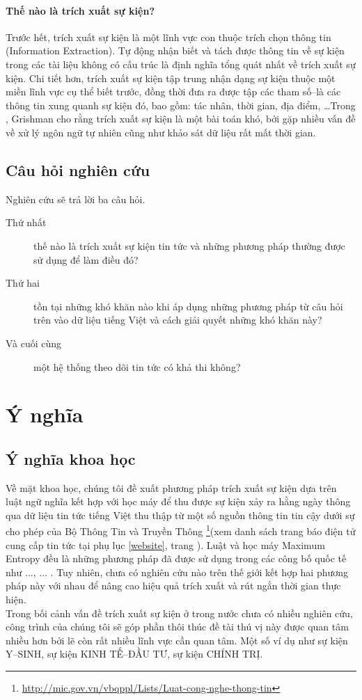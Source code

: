 \paragraph{Thế nào là trích xuất sự kiện?} Trước hết, trích xuất sự kiện là một lĩnh vực con thuộc trích chọn thông tin (Information Extraction). Tự động nhận biết và tách được thông tin về sự kiện trong các tài liệu không có cấu trúc là định nghĩa tổng quát nhất về trích xuất sự kiện. Chi tiết hơn, trích xuất sự kiện tập trung nhận dạng sự kiện thuộc một miền lĩnh vực cụ thể biết trước, đồng thời đưa ra được tập các tham số--là các thông tin xung quanh sự kiện đó, bao gồm: tác nhân, thời gian, địa điểm, \ldots Trong \cite{RG10}, Grishman cho rằng trích xuất sự kiện là một bài toán khó, bởi gặp nhiều vấn đề về xử lý ngôn ngữ tự nhiên cũng như khảo sát dữ liệu rất mất thời gian.


\subsection{Câu hỏi nghiên cứu}
 \noindent Nghiên cứu sẽ trả lời ba câu hỏi.
 \begin{description}
 \item[Thứ nhất] thế nào là trích xuất sự kiện tin tức và những phương pháp thường được sử dụng để làm điều đó?
\item[Thứ hai] tồn tại những khó khăn nào  khi áp dụng những phương pháp từ câu hỏi trên vào dữ liệu tiếng Việt và cách giải quyết những khó khăn này?
\item[Và cuối cùng] một hệ thống theo dõi tin tức có khả thi không?
 \end{description}

\section{Ý nghĩa}
    \label{meaning}
    \subsection{Ý nghĩa khoa học}

\noindent Về mặt khoa học, chúng tôi đề xuất phương pháp trích xuất sự kiện dựa trên luật ngữ nghĩa kết hợp với học máy để thu được sự kiện xảy ra hằng ngày thông qua  dữ liệu tin tức tiếng Việt thu thập từ một số nguồn thông tin tin cậy dưới sự cho phép của Bộ Thông Tin và Truyền Thông \footnote{\href{http://mic.gov.vn/vbqppl/Lists/Vn$\%$20bn$\%$20QPPL/DispForm.aspx?ID=6988}{http://mic.gov.vn/vbqppl/Lists/Luat-cong-nghe-thong-tin}}(xem danh sách trang báo điện tử cung cấp tin tức tại  phụ lục \ref{website}, trang \pageref{website}). Luật và học máy Maximum Entropy đều là những phương pháp đã được sử dụng trong các công bố quốc tế như ..., ... . Tuy nhiên, chưa có nghiên cứu nào trên thế giới kết hợp hai phương pháp này với nhau để nâng cao hiệu quả trích xuất và rút ngắn thời gian thực hiện.
\\ \noindent Trong bối cảnh vấn đề trích xuất sự kiện ở trong nước chưa có nhiều nghiên cứu, công trình của chúng tôi sẽ góp phần thôi thúc đề tài thú vị này được quan tâm nhiều hơn bởi lẽ còn rất nhiều lĩnh vực cần quan tâm. Một số ví dụ như sự kiện Y--SINH, sự kiện KINH TẾ--ĐẦU TƯ, sự kiện CHÍNH TRỊ.


